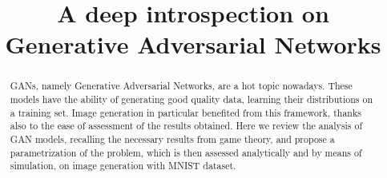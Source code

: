 \documentclass[article,10pt]{IEEEtran}
\begin{document}
\title{A deep introspection on Generative Adversarial Networks}

\author{

}

\maketitle		

\begin{abstract}
GANs, namely Generative Adversarial Networks, are a hot topic nowadays. These models have the ability of generating good quality data, learning their distributions on a training set. Image generation in particular benefited from this framework, thanks also to the ease of assessment of the results obtained. Here we review the analysis of GAN models, recalling the necessary results from game theory, and propose a parametrization of the problem, which is then assessed analytically and by means of simulation, on image generation with MNIST dataset.
\end{abstract}









\end{document}
